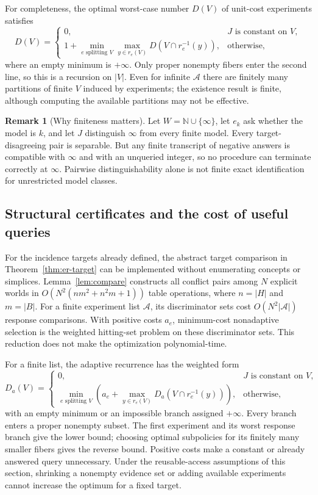 \documentclass[11pt]{article}
\theoremstyle{definition}
\newtheorem{remark}[theorem]{Remark}
\begin{document}
For completeness, the optimal worst-case number $D(V)$ of unit-cost
experiments satisfies
\[
 D(V)=
 \begin{cases}
 0,&J\text{ is constant on }V,\\[2pt]
 1+\displaystyle\min_{e\text{ splitting }V}
       \max_{y\in r_e(V)} D(V\cap r_e^{-1}(y)),&\text{otherwise},
 \end{cases}
\]
where an empty minimum is $+\infty$. Only proper nonempty fibers enter the
second line, so this is a recursion on $|V|$. Even for infinite $\mathcal A$
there are finitely many partitions of finite $V$ induced by experiments;
the existence result is finite, although computing the available partitions
may not be effective.

\begin{remark}[Why finiteness matters]
Let $W=\mathbb N\cup\{\infty\}$, let $e_k$ ask whether the model is $k$,
and let $J$ distinguish $\infty$ from every finite model. Every
target-disagreeing pair is separable. But any finite transcript of negative
answers is compatible with $\infty$ and with an unqueried integer, so no
procedure can terminate correctly at $\infty$. Pairwise distinguishability
alone is not finite exact identification for unrestricted model classes.
\end{remark}

\subsection{Structural certificates and the cost of useful queries}

For the incidence targets already defined, the abstract target comparison
in Theorem~\ref{thm:er-target} can be implemented without enumerating
concepts or simplices. Lemma~\ref{lem:compare} constructs all conflict
pairs among $N$ explicit worlds in
$O(N^2(nm^2+n^2m+1))$ table operations, where $n=|H|$ and $m=|B|$.
For a finite experiment list $\mathcal A$, its discriminator sets cost
$O(N^2|\mathcal A|)$ response comparisons. With positive costs $a_e$,
minimum-cost nonadaptive selection is the weighted hitting-set problem
on these discriminator sets. This reduction does not make the optimization
polynomial-time.

For a finite list, the adaptive recurrence has the weighted form
\[
 D_a(V)=
 \begin{cases}
 0,&J\text{ is constant on }V,\\[2pt]
 \displaystyle\min_{e\text{ splitting }V}
 \left(a_e+\max_{y\in r_e(V)}D_a(V\cap r_e^{-1}(y))\right),
 &\text{otherwise},
 \end{cases}
\]
with an empty minimum or an impossible branch assigned $+\infty$.
Every branch enters a proper nonempty subset. The first experiment and
its worst response branch give the lower bound; choosing optimal
subpolicies for its finitely many smaller fibers gives the reverse
bound. Positive costs make a constant or already answered query
unnecessary. Under the reusable-access assumptions of this section,
shrinking a nonempty evidence set or adding available experiments cannot
increase the optimum for a fixed target.
\end{document}

